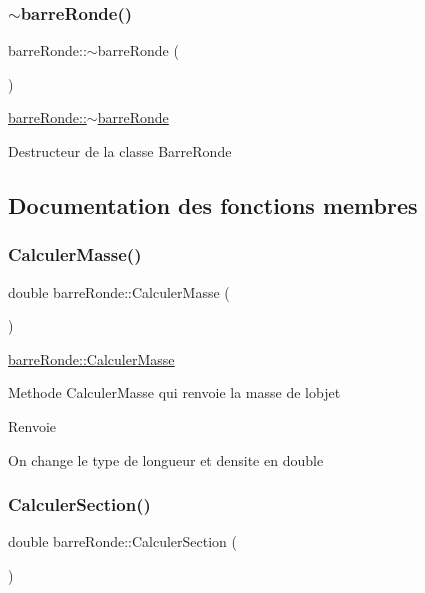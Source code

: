 \subsubsection{\texorpdfstring{$\sim$barre\+Ronde()}{~barreRonde()}}
{\footnotesize\ttfamily barre\+Ronde\+::$\sim$barre\+Ronde (\begin{DoxyParamCaption}{ }\end{DoxyParamCaption})}



\hyperlink{classbarre_ronde_ad297441fd7476ed15d45dc0030207125}{barre\+Ronde\+::$\sim$barre\+Ronde} 

Destructeur de la classe Barre\+Ronde 

\subsection{Documentation des fonctions membres}
\mbox{\label{classbarre_ronde_aca5b7e7ce02356570eb86d048788e076}} 
\subsubsection{\texorpdfstring{Calculer\+Masse()}{CalculerMasse()}}
{\footnotesize\ttfamily double barre\+Ronde\+::\+Calculer\+Masse (\begin{DoxyParamCaption}{ }\end{DoxyParamCaption})}



\hyperlink{classbarre_ronde_aca5b7e7ce02356570eb86d048788e076}{barre\+Ronde\+::\+Calculer\+Masse} 

Methode Calculer\+Masse qui renvoie la masse de l\textquotesingle{}objet \begin{DoxyReturn}{Renvoie}

\end{DoxyReturn}
On change le type de longueur et densite en double \mbox{\label{classbarre_ronde_aab6bddac0a3e8b9eb43d35903f5b4bc4}} 
\subsubsection{\texorpdfstring{Calculer\+Section()}{CalculerSection()}}
{\footnotesize\ttfamily double barre\+Ronde\+::\+Calculer\+Section (\begin{DoxyParamCaption}{ }\end{DoxyParamCaption})}



